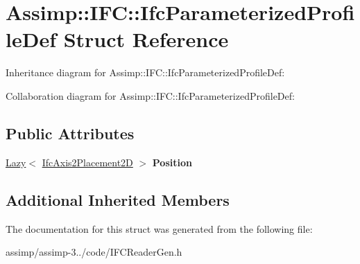 \hypertarget{struct_assimp_1_1_i_f_c_1_1_ifc_parameterized_profile_def}{\section{Assimp\+:\+:I\+F\+C\+:\+:Ifc\+Parameterized\+Profile\+Def Struct Reference}
\label{struct_assimp_1_1_i_f_c_1_1_ifc_parameterized_profile_def}
}


Inheritance diagram for Assimp\+:\+:I\+F\+C\+:\+:Ifc\+Parameterized\+Profile\+Def\+:


Collaboration diagram for Assimp\+:\+:I\+F\+C\+:\+:Ifc\+Parameterized\+Profile\+Def\+:
\subsection*{Public Attributes}
\begin{DoxyCompactItemize}
\item 
\hypertarget{struct_assimp_1_1_i_f_c_1_1_ifc_parameterized_profile_def_aa360c67caf604360b55dee88a7d2a8e7}{\hyperlink{struct_assimp_1_1_s_t_e_p_1_1_lazy}{Lazy}$<$ \hyperlink{struct_assimp_1_1_i_f_c_1_1_ifc_axis2_placement2_d}{Ifc\+Axis2\+Placement2\+D} $>$ {\bfseries Position}}\label{struct_assimp_1_1_i_f_c_1_1_ifc_parameterized_profile_def_aa360c67caf604360b55dee88a7d2a8e7}

\end{DoxyCompactItemize}
\subsection*{Additional Inherited Members}


The documentation for this struct was generated from the following file\+:\begin{DoxyCompactItemize}
\item 
assimp/assimp-\/3../code/I\+F\+C\+Reader\+Gen.\+h\end{DoxyCompactItemize}
